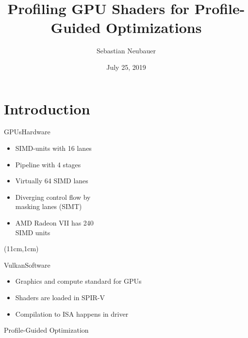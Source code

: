 \documentclass[xcolor={usenames,dvipsnames}, aspectratio=169, 12pt]{beamer}
\title[Master Thesis]{Profiling GPU Shaders for Profile-Guided Optimizations}
\author[S. Neubauer]{Sebastian Neubauer}
\date{July 25, 2019}
\institute{Technische Universität München}
\begin{document}
\frame[plain]{\titlepage}

\section{Introduction}

\begin{frame}{GPUs}{Hardware}
\begin{itemize}
	\item SIMD-units with 16 lanes
	\item Pipeline with 4 stages
	\item Virtually 64 SIMD lanes
	\item Diverging control flow by\\masking lanes (SIMT)
	\item AMD Radeon VII has 240\\SIMD units
\end{itemize}
\begin{textblock*}{5cm}(11cm,1cm)
	
\end{textblock*}
\end{frame}

{\framelogo{\centering}
\begin{frame}{Vulkan}{Software}
\begin{itemize}
	\item Graphics and compute standard for GPUs
	\item Shaders are loaded in SPIR-V
	\item Compilation to ISA happens in driver
\end{itemize}
\end{frame}}

\begin{frame}{}{Profile-Guided Optimization}

\end{frame}
\end{document}

